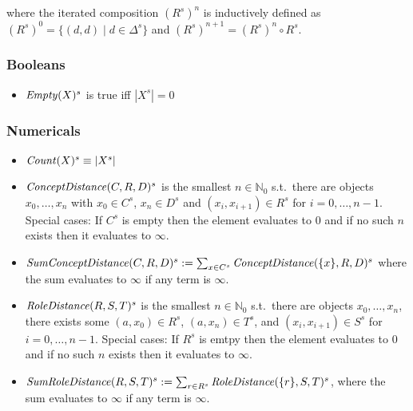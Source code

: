 \documentclass{article}
\begin{document}
where the iterated composition $(R^s)^n$ is inductively defined as
$(R^s)^0 = \{(d,d)\mid d\in\Delta^s\}$ and $(R^s)^{n+1} = (R^s)^n\circ R^s$.

\subsubsection{Booleans}

\begin{itemize}
    \item $\mathit{Empty}(X)^s$ is true iff $|X^s| = 0$
\end{itemize}

\subsubsection{Numericals}

\begin{itemize}
    \item $\mathit{Count}(X)^s\equiv |X^s|$
    \item $\mathit{ConceptDistance}(C, R, D)^s$ is the smallest $n\in\mathbb{N}_0$
    s.t.\ there are objects $x_0,\ldots,x_n$ with
    $x_0\in C^s$, $x_n\in D^s$ and $(x_i, x_{i+1})\in R^s$ for $i = 0,\ldots,n-1$.
    Special cases: If $C^s$ is empty then the element evaluates to $0$ and if no such $n$ exists then it evaluates to $\infty$.
    \item $\mathit{SumConceptDistance}(C, R, D)^s:=\sum_{x\in C^s}\mathit{ConceptDistance}(\{x\}, R, D)^s$
    where the sum evaluates to $\infty$ if any term is $\infty$.
    \item $\mathit{RoleDistance}(R, S, T)^s$ is the smallest $n\in\mathbb{N}_0$
    s.t.\ there are objects $x_0,\ldots,x_n$,
    there exists some $(a,x_0)\in R^s$, $(a,x_n)\in T^s$,
    and $(x_i, x_{i+1})\in S^s$ for $i = 0,\ldots,n-1$.
    Special cases: If $R^s$ is emtpy then the element evaluates to $0$ and if no such $n$ exists then it evaluates to $\infty$.
    \item $\mathit{SumRoleDistance}(R, S, T)^s:=\sum_{r\in R^s}\mathit{RoleDistance}(\{r\}, S, T)^s$,
    where the sum evaluates to $\infty$ if any term is $\infty$.
\end{itemize}



\end{document}
